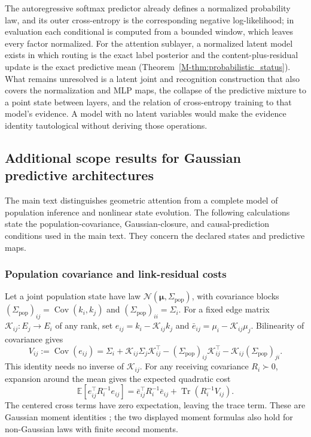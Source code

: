 \documentclass[twoside,11pt]{article}
\begin{document}
The autoregressive softmax predictor already defines a normalized probability law, and its outer cross-entropy is the corresponding negative log-likelihood; in evaluation each conditional is computed from a bounded window, which leaves every factor normalized. For the attention sublayer, a normalized latent model exists in which routing is the exact label posterior and the content-plus-residual update is the exact predictive mean (Theorem~\ref{M-thm:probabilistic_status}). What remains unresolved is a latent joint and recognition construction that also covers the normalization and MLP maps, the collapse of the predictive mixture to a point state between layers, and the relation of cross-entropy training to that model's evidence. A model with no latent variables would make the evidence identity tautological without deriving those operations.


\subsection{Additional scope results for Gaussian predictive architectures}
\label{app:architecture_scope}

The main text distinguishes geometric attention from a complete model of population inference and nonlinear state evolution. The following calculations state the population-covariance, Gaussian-closure, and causal-prediction conditions used in the main text. They concern the declared states and predictive maps.

\subsubsection{Population covariance and link-residual costs}
\label{sec:population_link_residuals}

Let a joint population state have law
\(\mathcal N(\boldsymbol\mu,\Sigma_{\mathrm{pop}})\), with covariance blocks
\((\Sigma_{\mathrm{pop}})_{ij}=\operatorname{Cov}(k_i,k_j)\) and
\((\Sigma_{\mathrm{pop}})_{ii}=\Sigma_i\). For a fixed edge matrix \(\mathcal K_{ij}:E_j\to E_i\) of any rank, set
\(e_{ij}=k_i-\mathcal K_{ij}k_j\) and
\(\bar e_{ij}=\mu_i-\mathcal K_{ij}\mu_j\). Bilinearity of covariance gives
\begin{equation}
V_{ij}:=\operatorname{Cov}(e_{ij})
=\Sigma_i+\mathcal K_{ij}\Sigma_j\mathcal K_{ij}^{\top}
-(\Sigma_{\mathrm{pop}})_{ij}\mathcal K_{ij}^{\top}-\mathcal K_{ij}(\Sigma_{\mathrm{pop}})_{ji}.
\label{eq:population_residual_covariance}
\end{equation}
This identity needs no inverse of \(\mathcal K_{ij}\). For any receiving covariance \(R_i\succ0\), expansion around the mean gives the expected quadratic cost
\begin{equation}
\mathbb E[e_{ij}^{\top}R_i^{-1}e_{ij}]
=\bar e_{ij}^{\top}R_i^{-1}\bar e_{ij}
+\operatorname{Tr}(R_i^{-1}V_{ij}).
\label{eq:population_residual_cost}
\end{equation}
The centered cross terms have zero expectation, leaving the trace term. These are Gaussian moment identities \citep{Bishop2006}; the two displayed moment formulas also hold for non-Gaussian laws with finite second moments.
\end{document}
